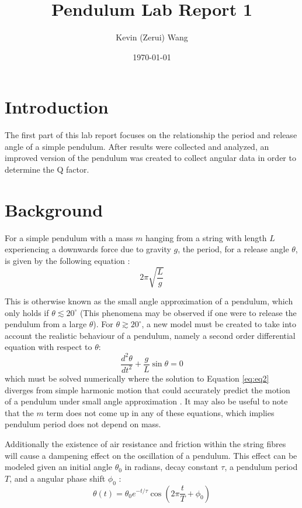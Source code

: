 \documentclass[12pt]{article}
\title{Pendulum Lab Report 1}
\author{Kevin (Zerui) Wang}
\date{\today}
\begin{document}

\maketitle


\section{Introduction}
The first part of this lab report focuses on the relationship the period and release angle of a simple pendulum. After results were collected and analyzed, an improved version of the pendulum was created to collect angular data in order to determine the Q factor.

\section{Background} \label{Background}
For a simple pendulum with a mass $m$ hanging from a string with length $L$ experiencing a downwards force due to gravity $g$, the period, for a release angle $\theta$, is given by the following equation \cite{the-simple-pendulum}:
\begin{equation} \label{eq:eq1}
    2\pi \sqrt{\frac{L}{g}}
\end{equation}

This is otherwise known as the small angle approximation of a pendulum, which only holds if $\theta \lesssim 20^{\circ}$ \cite{the-simple-pendulum} (This phenomena may be observed if one were to release the pendulum from a large $\theta$). For $\theta \gtrsim 20^{\circ}$, a new model must be created to take into account the realistic behaviour of a pendulum, namely a second order differential equation with respect to $\theta$:
\begin{equation} \label{eq:eq2}
    \frac{d^2\theta}{dt^2} + \frac{g}{L}\sin{\theta} = 0
\end{equation}
which must be solved numerically where the solution to Equation \ref{eq:eq2} diverges from simple harmonic motion that could accurately predict the motion of a pendulum under small angle approximation \cite{the-simple-pendulum}. It may also be useful to note that the $m$ term does not come up in any of these equations, which implies pendulum period does not depend on mass.

Additionally the existence of air resistance and friction within the string fibres will cause a dampening effect on the oscillation of a pendulum. This effect can be modeled given an initial angle $\theta_0$ in radians, decay constant $\tau$, a pendulum period $T$, and a angular phase shift $\phi_0$ \cite{damped-oscillations}:
\begin{equation} \label{eq:eq3}
    \theta(t) = \theta_0 e^{-{t/\tau}} \cos\left(2\pi\frac{t}{T} + \phi_0\right)
\end{equation}
\end{document}
